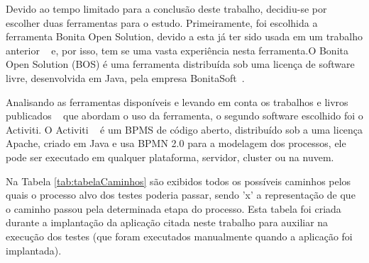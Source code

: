 \documentclass[12pt]{article}
\begin{document}
Devido ao tempo limitado para a conclusão deste trabalho, decidiu-se por escolher duas ferramentas para o estudo. Primeiramente, foi escolhida a ferramenta Bonita Open Solution, devido a esta já ter sido usada em um trabalho anterior ~\cite{sbsi2013} e, por isso, tem se uma vasta experiência nesta ferramenta.O Bonita Open Solution (BOS) é uma ferramenta distribuída sob uma licença de software livre, desenvolvida em Java, pela empresa BonitaSoft~\cite{BONITASOFT}.%

Analisando as ferramentas disponíveis e levando em conta os trabalhos e livros publicados ~\cite{rademakers2012activiti} que abordam o uso da ferramenta, o segundo software escolhido foi o Activiti. O Activiti ~\cite{ACTIVITI} é um BPMS de código aberto, distribuído sob a uma licença Apache, criado em Java e usa  BPMN 2.0 para a modelagem dos processos, ele pode ser executado em qualquer plataforma, servidor, cluster ou na nuvem. %

Na Tabela \ref{tab:tabelaCaminhos} são exibidos todos os possíveis caminhos pelos quais o processo alvo dos testes poderia passar, sendo 'x' a representação de que o caminho passou pela determinada etapa do processo. Esta tabela foi criada durante a implantação da aplicação citada neste trabalho para auxiliar na execução dos testes (que foram executados manualmente quando a aplicação foi implantada).
\end{document}
